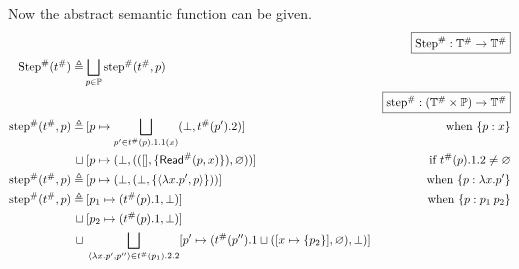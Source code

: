 Now the abstract semantic function can be given.
\begin{align*}
                                     &                                                                                                                                             & \fbox{$\Abs\Step:\Abs{\mathbb{T}}\rightarrow\Abs{\mathbb{T}}$}                   \\
  \Abs\Step(\Abs\ptree)   \triangleq & \bigsqcup_{p\in\mathbb{P}}\Abs\step(\Abs\ptree,p)                                                                                                                                                                              \\
                                     &                                                                                                                                             & \fbox{$\Abs\step:(\Abs{\mathbb{T}}\times\mathbb{P})\rightarrow\Abs{\mathbb{T}}$} \\
  \Abs\step(\Abs\ptree,p) \triangleq & \: [p\mapsto\bigsqcup_{p'\in\Abs\ptree(p).1.1(x)}(\bot,\Abs\ptree(p').2)]                                                                   & \text{when }\plabel{p}{x}                                                        \\
  \sqcup                             & \: [p\mapsto(\bot,(([],\{\Abs\ReadE(p,x)\}),\varnothing))]                                                                                  & \text{if }\Abs\ptree(p).1.2\neq\varnothing                                       \\
  \Abs\step(\Abs\ptree,p) \triangleq & \: [p\mapsto(\bot,(\bot,\{\langle\lambda x.p',p\rangle\}))]                                                                                 & \text{when }\plabel{p}{\lambda x.p'}                                             \\
  \Abs\step(\Abs\ptree,p) \triangleq & \: [p_1\mapsto(\Abs\ptree(p).1,\bot)]                                                                                                       & \text{when }\plabel{p}{p_1\:p_2}                                                 \\
  \sqcup                             & \: [p_2\mapsto(\Abs\ptree(p).1,\bot)]                                                                                                                                                                                          \\
  \sqcup                             & \: \bigsqcup_{\langle\lambda x.p',p''\rangle\in\Abs\ptree(p_1).2.2}[p'\mapsto(\Abs\ptree(p'').1\sqcup([x\mapsto\{p_2\}],\varnothing),\bot)]                                                                                    \\

\end{align*}
